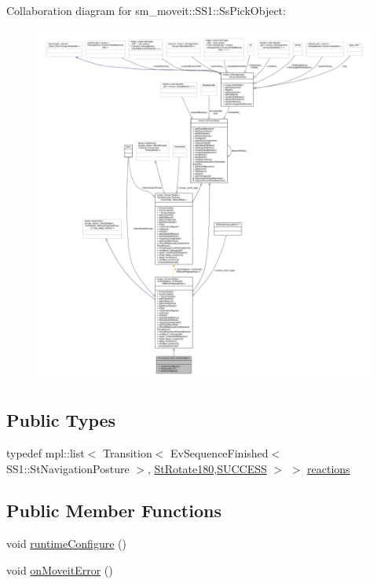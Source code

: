 Collaboration diagram for sm\+\_\+moveit\+:\+:S\+S1\+:\+:Ss\+Pick\+Object\+:
\nopagebreak
\begin{figure}[H]
\begin{center}
\leavevmode
\includegraphics[width=350pt]{structsm__moveit_1_1SS1_1_1SsPickObject__coll__graph}
\end{center}
\end{figure}
\subsection*{Public Types}
\begin{DoxyCompactItemize}
\item 
typedef mpl\+::list$<$ Transition$<$ Ev\+Sequence\+Finished$<$ S\+S1\+::\+St\+Navigation\+Posture $>$, \hyperlink{structsm__moveit_1_1StRotate180}{St\+Rotate180},\hyperlink{classSUCCESS}{S\+U\+C\+C\+E\+SS} $>$ $>$ \hyperlink{structsm__moveit_1_1SS1_1_1SsPickObject_a2d0c00287bd2081d8c92495ef5227e5e}{reactions}
\end{DoxyCompactItemize}
\subsection*{Public Member Functions}
\begin{DoxyCompactItemize}
\item 
void \hyperlink{structsm__moveit_1_1SS1_1_1SsPickObject_acb8cbbad6e452a98ff2ccf93a6bdd1a4}{runtime\+Configure} ()
\item 
void \hyperlink{structsm__moveit_1_1SS1_1_1SsPickObject_aa5ad4c6436b70a13b27a45936876374c}{on\+Moveit\+Error} ()
\end{DoxyCompactItemize}
